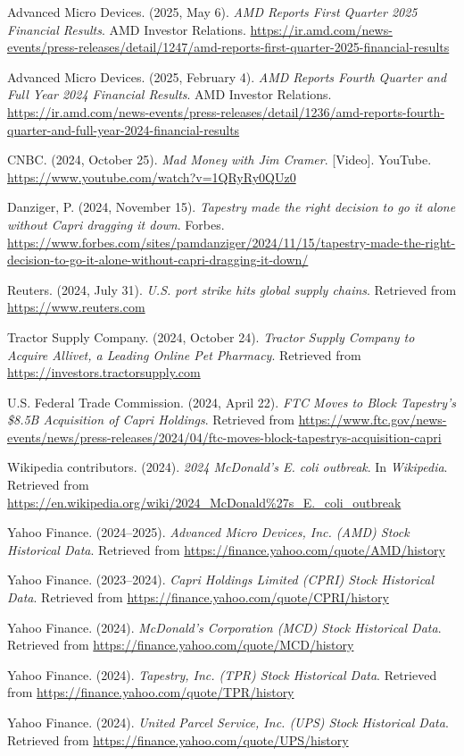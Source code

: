 \documentclass[12pt,a4paper]{article}
\begin{document}
\begin{thebibliography}{9}
 Advanced Micro Devices. (2025, May 6).  
\textit{AMD Reports First Quarter 2025 Financial Results}. AMD Investor Relations.  
\url{https://ir.amd.com/news-events/press-releases/detail/1247/amd-reports-first-quarter-2025-financial-results}

 Advanced Micro Devices. (2025, February 4).  
\textit{AMD Reports Fourth Quarter and Full Year 2024 Financial Results}. AMD Investor Relations.  
\url{https://ir.amd.com/news-events/press-releases/detail/1236/amd-reports-fourth-quarter-and-full-year-2024-financial-results}

 CNBC. (2024, October 25).  
\textit{Mad Money with Jim Cramer}. [Video]. YouTube.  
\url{https://www.youtube.com/watch?v=1QRyRy0QUz0}

 Danziger, P. (2024, November 15).  
\textit{Tapestry made the right decision to go it alone without Capri dragging it down}. Forbes.  
\url{https://www.forbes.com/sites/pamdanziger/2024/11/15/tapestry-made-the-right-decision-to-go-it-alone-without-capri-dragging-it-down/}

 Reuters. (2024, July 31).  
\textit{U.S. port strike hits global supply chains}.  
Retrieved from \url{https://www.reuters.com}

 Tractor Supply Company. (2024, October 24).  
\textit{Tractor Supply Company to Acquire Allivet, a Leading Online Pet Pharmacy}.  
Retrieved from \url{https://investors.tractorsupply.com}

 U.S. Federal Trade Commission. (2024, April 22).  
\textit{FTC Moves to Block Tapestry’s \$8.5B Acquisition of Capri Holdings}.  
Retrieved from \url{https://www.ftc.gov/news-events/news/press-releases/2024/04/ftc-moves-block-tapestrys-acquisition-capri}

 Wikipedia contributors. (2024).  
\textit{2024 McDonald’s E. coli outbreak}. In \textit{Wikipedia}.  
Retrieved from \url{https://en.wikipedia.org/wiki/2024_McDonald%27s_E._coli_outbreak}

 Yahoo Finance. (2024–2025).  
\textit{Advanced Micro Devices, Inc. (AMD) Stock Historical Data}.  
Retrieved from \url{https://finance.yahoo.com/quote/AMD/history}

 Yahoo Finance. (2023–2024).  
\textit{Capri Holdings Limited (CPRI) Stock Historical Data}.  
Retrieved from \url{https://finance.yahoo.com/quote/CPRI/history}

 Yahoo Finance. (2024).  
\textit{McDonald’s Corporation (MCD) Stock Historical Data}.  
Retrieved from \url{https://finance.yahoo.com/quote/MCD/history}

 Yahoo Finance. (2024).  
\textit{Tapestry, Inc. (TPR) Stock Historical Data}.  
Retrieved from \url{https://finance.yahoo.com/quote/TPR/history}

 Yahoo Finance. (2024).  
\textit{United Parcel Service, Inc. (UPS) Stock Historical Data}.  
Retrieved from \url{https://finance.yahoo.com/quote/UPS/history}

\end{thebibliography}
\end{document}
